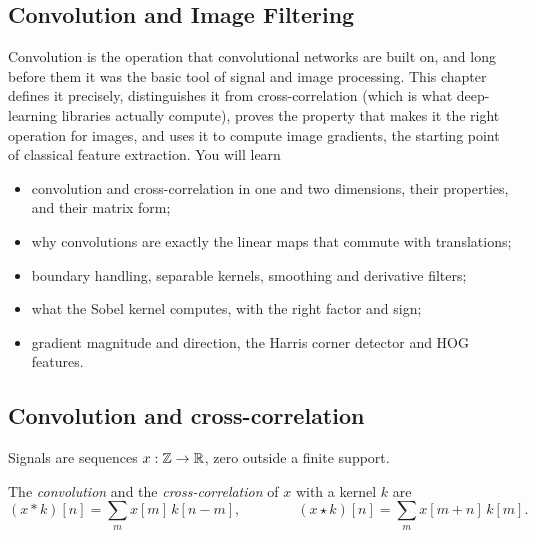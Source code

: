 \begin{notechapter}
\chapter{Convolution and Image Filtering}\label{ch:convolution-filtering}

\begin{chapterintro}
Convolution is the operation that convolutional networks are built on, and long before
them it was the basic tool of signal and image processing. This chapter defines it
precisely, distinguishes it from cross-correlation (which is what deep-learning libraries
actually compute), proves the property that makes it the right operation for images, and
uses it to compute image gradients, the starting point of classical feature extraction. You
will learn
\begin{itemize}[nosep]
  \item convolution and cross-correlation in one and two dimensions, their properties, and
        their matrix form;
  \item why convolutions are exactly the linear maps that commute with translations;
  \item boundary handling, separable kernels, smoothing and derivative filters;
  \item what the Sobel kernel computes, with the right factor and sign;
  \item gradient magnitude and direction, the Harris corner detector and HOG features.
\end{itemize}
\end{chapterintro}

\section{Convolution and cross-correlation}\label{convolution-filtering:sec:definitions}

Signals are sequences $x:\mathbb{Z}\to\mathbb{R}$, zero outside a finite support.

\begin{definition}\label{convolution-filtering:def:conv}
The \emph{convolution} and the \emph{cross-correlation} of $x$ with a kernel $k$ are
\[
  (x * k)[n] = \sum_mx[m]\,k[n - m],\qquad\qquad(x\star k)[n] = \sum_mx[m + n]\,k[m] .
\]
\end{definition}


\end{notechapter}

